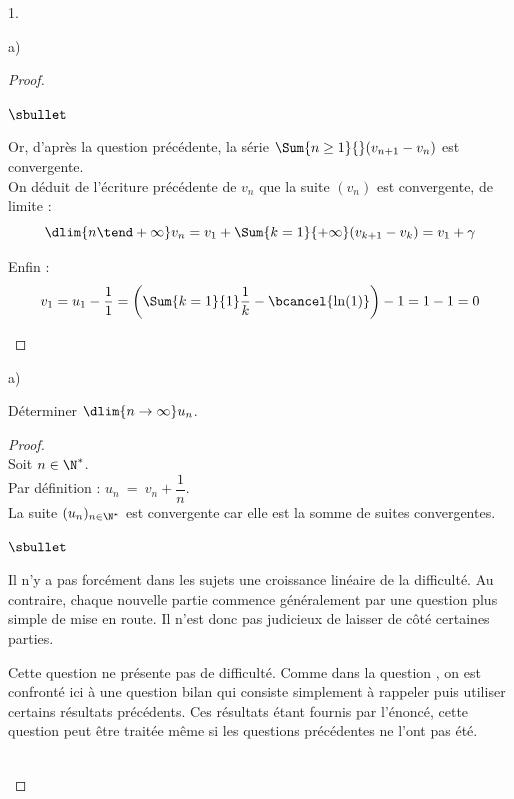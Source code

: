 \documentclass[11pt]{article}%
\begin{document}
\begin{noliste}{1.}
\begin{noliste}{a)}
\begin{proof}
\begin{noliste}{$\sbullet$}
      \item Or, d'après la question précédente, la série $\Sum{n \geq
          1}{} (v_{n+1} - v_n)$ est convergente.\\
        On déduit de l'écriture précédente de $v_n$ que la suite
        $(v_n)$ est convergente, de limite :
        \[
        \dlim{n \tend +\infty} v_n = v_1 + \Sum{k=1}{+\infty} (v_{k+1}
        - v_k) = v_1 + \gamma
        \]

      \item Enfin :
        \[
        v_1 = u_1 - \dfrac{1}{1} = \left(\Sum{k=1}{1} \dfrac{1}{k} -
          \bcancel{\ln(1)} \right) - 1 = 1 - 1 = 0
        \]
      \end{noliste}
    \end{proof}

  \end{noliste}

\item 
  \begin{noliste}{a)} 
    \setlength{\itemsep}{2mm}
  \item Déterminer $ \dlim{n \to \infty} u_{n}$.

    \begin{proof}~\\%
      Soit $n \in \N^*$.\\
      Par définition : $u_n \ = \ v_n + \dfrac{1}{n}$.\\
      La suite $(u_n)_{n \in \N^*}$ est convergente car elle est la
      somme de suites convergentes.%
      \begin{remarkL}{.97}%
        \begin{noliste}{$\sbullet$}
        \item Il n’y a pas forcément dans les sujets une croissance
          linéaire de la difficulté. Au contraire, chaque nouvelle
          partie commence généralement par une question plus simple de
          mise en route. Il n’est donc pas judicieux de laisser de
          côté certaines parties.
        \item Cette question  ne présente pas de
          difficulté. Comme dans la question , on est
          confronté ici à une question bilan qui consiste simplement à
          rappeler puis utiliser certains résultats précédents. Ces
          résultats étant fournis par l'énoncé, cette question peut
          être traitée même si les questions précédentes ne l'ont pas
          été.
        \end{noliste}
      \end{remarkL}~\\[-1.3cm]
    \end{proof}


\end{noliste}
\end{noliste}
\end{document}
